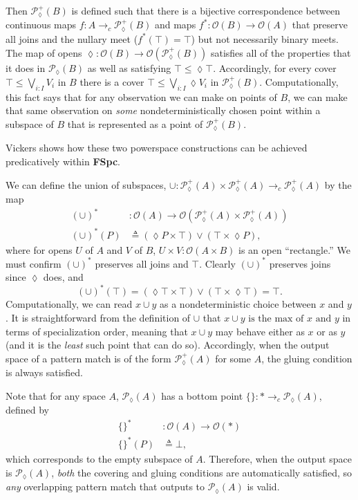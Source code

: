 \documentclass[conference]{IEEEtran}
\newcommand{\PLower}{\mathcal{P}_\lozenge}
\newcommand{\cto}{\to_c}
\newcommand{\One}{\ast}
\newcommand{\Open}[1]{\mathcal{O}({#1})}
\newcommand{\isthemaxof}[3]{{#1}\text{ is the max of }{#2}\text{ and }{#3}}
\newcommand{\iimg}[1]{#1^*}
\begin{document}
Then $\PLower^+(B)$ is defined such that there is a bijective correspondence between continuous maps $f : A \cto \PLower^+(B)$ and maps $\iimg{f} : \Open{B} \to \Open{A}$ that preserve all joins and the nullary meet ($\iimg{f}(\top) = \top$) but not necessarily binary meets. The map of opens $\lozenge : \Open{B} \to \Open{\PLower^+(B)}$ satisfies all of the properties that it does in $\PLower(B)$ as well as satisfying
$\top \le \lozenge \top$. Accordingly, for every cover $\top \le \bigvee_{i : I} V_i$ in $B$ there is a cover $\top \le \bigvee_{i : I} \lozenge V_i$ in $\PLower^+(B)$. Computationally, this fact says that for any observation we can make on points of $B$, we can make that same observation on \emph{some} nondeterministically chosen point within a subspace of $B$ that is represented as a point of $\PLower^+(B)$.

Vickers \cite{vickersdoublepowerlocale} shows how these two powerspace constructions can be achieved predicatively within \textbf{FSpc}. 

We can define the union of subspaces, $
\cup : \PLower^+(A) \times \PLower^+(A) \cto \PLower^+(A)$ by the map
\begin{align*}
\iimg{(\cup)} &: \Open{A} \to \Open{\PLower^+(A) \times \PLower^+(A)}
\\ \iimg{(\cup)}(P) &\triangleq (\lozenge P \times \top) \vee (\top \times \lozenge P),
\end{align*}
where for opens $U$ of $A$ and $V$ of $B$, $U \times V : \Open{A \times B}$ is an open ``rectangle.''
We must confirm $\iimg{(\cup)}$ preserves all joins and $\top$. Clearly $\iimg{(\cup)}$ preserves joins since $\lozenge$ does, and
\[
\iimg{(\cup)}(\top) = (\lozenge \top \times \top) \vee (\top \times \lozenge \top) = \top.
\]
Computationally, we can read $x \cup y$ as a nondeterministic choice between $x$ and $y$.
It is straightforward from the definition of $\cup$ that $\isthemaxof{x \cup y}{x}{y}$ in terms of specialization order, meaning that $x \cup y$ may behave either as $x$ or as $y$ (and it is the \emph{least} such point that can do so). Accordingly, when the output space of a pattern match is of the form $\PLower^+(A)$ for some $A$, the gluing condition is always satisfied.

Note that for any space $A$, $\PLower(A)$ has a bottom point $\{ \} : \One \cto \PLower(A)$, defined by
\begin{align*}
\iimg{\{\}} &: \Open{A} \to \Open{\One}
\\ \iimg{\{ \}}(P) &\triangleq \bot,
\end{align*}
which corresponds to the empty subspace of $A$. Therefore, when the output space is $\PLower(A)$, \emph{both} the covering and gluing conditions are automatically satisfied, so \emph{any} overlapping pattern match that outputs to $\PLower(A)$ is valid.
\end{document}
